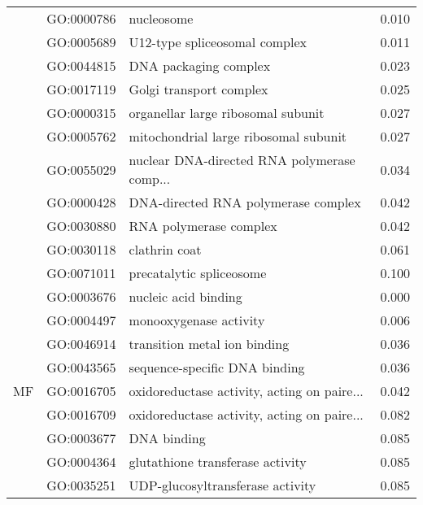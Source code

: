 \begin{longtable}{lllr}
   & GO:0000786 &                                   nucleosome &         0.010 \\
   & GO:0005689 &                U12-type spliceosomal complex &         0.011 \\
   & GO:0044815 &                        DNA packaging complex &         0.023 \\
   & GO:0017119 &                      Golgi transport complex &         0.025 \\
   & GO:0000315 &           organellar large ribosomal subunit &         0.027 \\
   & GO:0005762 &        mitochondrial large ribosomal subunit &         0.027 \\
   & GO:0055029 &  nuclear DNA-directed RNA polymerase comp... &         0.034 \\
   & GO:0000428 &          DNA-directed RNA polymerase complex &         0.042 \\
   & GO:0030880 &                       RNA polymerase complex &         0.042 \\
   & GO:0030118 &                                clathrin coat &         0.061 \\
   & GO:0071011 &                     precatalytic spliceosome &         0.100 \\
\cline{1-4}
\multirow{9}{*}{MF} & GO:0003676 &                         nucleic acid binding &         0.000 \\
   & GO:0004497 &                       monooxygenase activity &         0.006 \\
   & GO:0046914 &                 transition metal ion binding &         0.036 \\
   & GO:0043565 &                sequence-specific DNA binding &         0.036 \\
   & GO:0016705 &  oxidoreductase activity, acting on paire... &         0.042 \\
   & GO:0016709 &  oxidoreductase activity, acting on paire... &         0.082 \\
   & GO:0003677 &                                  DNA binding &         0.085 \\
   & GO:0004364 &             glutathione transferase activity &         0.085 \\
   & GO:0035251 &             UDP-glucosyltransferase activity &         0.085 \\
\end{longtable}
